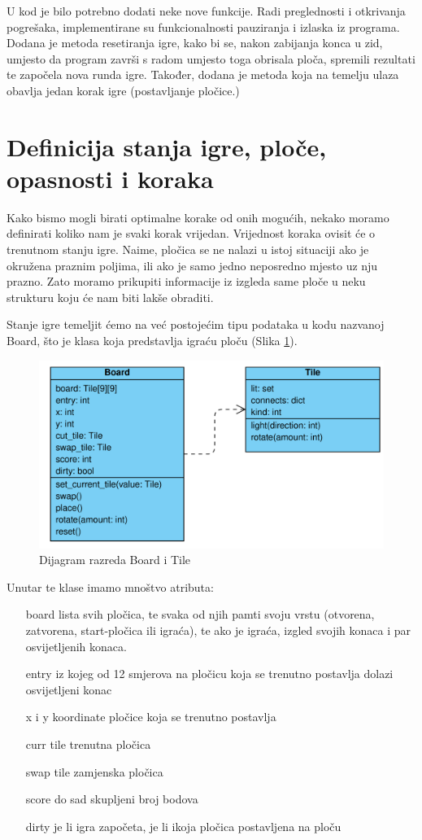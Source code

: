 \documentclass[zavrsnirad]{fer}
\begin{document}
U kod je bilo potrebno dodati neke nove funkcije. Radi preglednosti i otkrivanja pogrešaka, implementirane su funkcionalnosti pauziranja i izlaska iz programa. Dodana je metoda resetiranja igre, kako bi se, nakon zabijanja konca u zid, umjesto da program završi s radom umjesto toga obrisala ploča, spremili rezultati te započela nova runda igre. Također, dodana je metoda koja na temelju ulaza obavlja jedan korak igre (postavljanje pločice.)



\section{Definicija stanja igre, ploče, opasnosti i koraka}
\label{pog:definicija_stanja}

Kako bismo mogli birati optimalne korake od onih mogućih, nekako moramo definirati koliko nam je svaki korak vrijedan. Vrijednost koraka ovisit će o trenutnom stanju igre. Naime, pločica se ne nalazi u istoj situaciji ako je okružena praznim poljima, ili ako je samo jedno neposredno mjesto uz nju prazno. Zato moramo prikupiti informacije iz izgleda same ploče u neku strukturu koju će nam biti lakše obraditi.

Stanje igre temeljit ćemo na već postojećim tipu podataka u kodu nazvanoj Board, što je klasa koja predstavlja igraću ploču (Slika \ref{slk:class_diagram}).

\begin{figure}[htb]
	\centering
	\includegraphics[width=0.68\linewidth]{Figures/board_diagram.png} 
	\caption{Dijagram razreda Board i Tile}
	\label{slk:class_diagram}
\end{figure}

Unutar te klase imamo mnoštvo atributa:
\begin{itemize}
	\item[board] lista svih pločica, te svaka od njih pamti svoju vrstu (otvorena, zatvorena, start-pločica ili igraća), te ako je igraća, izgled svojih konaca i par osvijetljenih konaca.
	\item[entry] iz kojeg od 12 smjerova na pločicu koja se trenutno postavlja dolazi osvijetljeni konac
	\item[x i y] koordinate pločice koja se trenutno postavlja
	\item[curr tile] trenutna pločica
	\item[swap tile] zamjenska pločica
	\item[score] do sad skupljeni broj bodova
	\item[dirty] je li igra započeta, je li ikoja pločica postavljena na ploču
\end{itemize}
\end{document}
